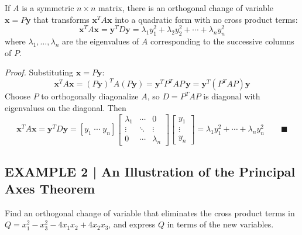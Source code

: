 \documentclass{article}
\begin{document}
\begin{tcolorbox}[colback=red!4, colframe=red!60!black,
  title={\textbf{Theorem 7.3.1 --- The Principal Axes Theorem}}, boxrule=0.5mm, arc=3mm]
If $A$ is a symmetric $n\times n$ matrix, there is an orthogonal change of variable
$\mathbf{x}=P\mathbf{y}$ that transforms $\mathbf{x}^T A\mathbf{x}$ into a quadratic form
with no cross product terms:
\[
  \mathbf{x}^T A\mathbf{x} = \mathbf{y}^T D\mathbf{y}
  = \lambda_1y_1^2+\lambda_2y_2^2+\cdots+\lambda_ny_n^2
\]
where $\lambda_1,\ldots,\lambda_n$ are the eigenvalues of $A$ corresponding to the successive
columns of $P$.
\end{tcolorbox}

\textit{Proof.} Substituting $\mathbf{x}=P\mathbf{y}$:
\begin{equation}
  \mathbf{x}^T A\mathbf{x} = (P\mathbf{y})^T A(P\mathbf{y}) = \mathbf{y}^T P^T AP\,\mathbf{y}
  = \mathbf{y}^T(P^T AP)\mathbf{y} \tag{6}
\end{equation}
Choose $P$ to orthogonally diagonalize $A$, so $D=P^T AP$ is diagonal with eigenvalues on the
diagonal. Then
\[
  \mathbf{x}^T A\mathbf{x} = \mathbf{y}^T D\mathbf{y}
  = [y_1\;\cdots\;y_n]\begin{bmatrix}\lambda_1&\cdots&0\\\vdots&\ddots&\vdots\\0&\cdots&\lambda_n\end{bmatrix}
  \begin{bmatrix}y_1\\\vdots\\y_n\end{bmatrix}
  = \lambda_1y_1^2+\cdots+\lambda_ny_n^2 \qquad\blacksquare
\]

\subsection*{EXAMPLE 2 | An Illustration of the Principal Axes Theorem}

Find an orthogonal change of variable that eliminates the cross product terms in
$Q=x_1^2-x_3^2-4x_1x_2+4x_2x_3$, and express $Q$ in terms of the new variables.
\end{document}
